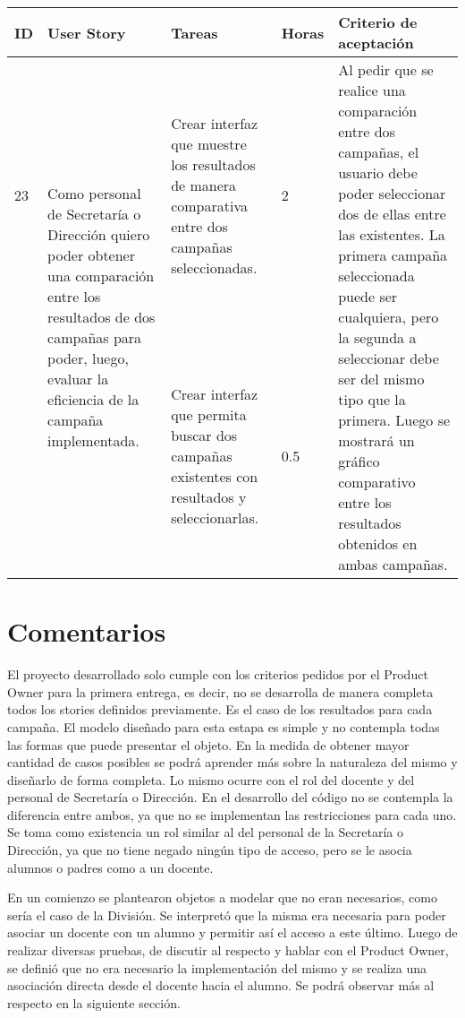 \documentclass[a4paper, 11pt]{article}
\begin{document}
\begin{table}[H]
\centering
\begin{tabular}{ | p{0.5cm} | p{4cm} | p{5cm} | p{0.85cm} | p{5cm} |}
\hline 
ID & User Story & Tareas & Horas & Criterio de aceptación \\ \hline \hline

23 & \multirow{2}{4cm}{Como personal de Secretaría o Dirección quiero poder obtener una comparación entre los resultados de dos campañas para poder, luego, evaluar la eficiencia de la campaña implementada.} & Crear interfaz que muestre los resultados de manera comparativa entre dos campañas seleccionadas. & 2 & \multirow{2}{5cm}{Al pedir que se realice una comparación entre dos campañas, el usuario debe poder seleccionar dos de ellas entre las existentes. La primera campaña seleccionada puede ser cualquiera, pero la segunda a seleccionar debe ser del mismo tipo que la primera. Luego se mostrará un gráfico comparativo entre los resultados obtenidos en ambas campañas. } \\[3cm] \cline{3-4}
& & Crear interfaz que permita buscar dos campañas existentes con resultados y seleccionarlas. & 0.5 & \\[3cm] \hline

\end{tabular}
\end{table}

\section{Comentarios}
El proyecto desarrollado solo cumple con los criterios pedidos por el Product Owner para la primera entrega, es decir, no se desarrolla de manera completa todos los stories definidos previamente. 
Es el caso de los resultados para cada campaña. El modelo diseñado para esta estapa es simple y no contempla todas las formas que puede presentar el objeto. En la medida de obtener mayor cantidad de casos posibles se podrá aprender más sobre la naturaleza del mismo y diseñarlo de forma completa. 
Lo mismo ocurre con el rol del docente y del personal de Secretaría o Dirección. En el desarrollo del código no se contempla la diferencia entre ambos, ya que no se implementan las restricciones para cada uno. Se toma como existencia un rol similar al del personal de la Secretaría o Dirección, ya que no tiene negado ningún tipo de acceso, pero se le asocia alumnos o padres como a un docente. 

En un comienzo se plantearon objetos a modelar que no eran necesarios, como sería el caso de la División. Se interpretó que la misma era necesaria para poder asociar un docente con un alumno y permitir así el acceso a este último. Luego de realizar diversas pruebas, de discutir al respecto y hablar con el Product Owner, se definió que no era necesario la implementación del mismo y se realiza una asociación directa desde el docente hacia el alumno. Se podrá observar más al respecto en la siguiente sección. 
\end{document}
